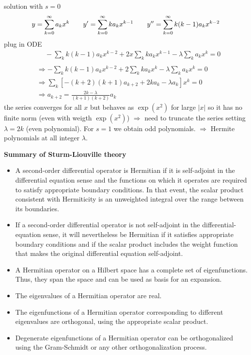 \documentclass{article}
\begin{document}
solution with $s=0$
\begin{equation}
    y = \sum_{k=0}^{\infty} a_k x^k \qquad y' = \sum_{k=0}^{\infty} k a_k x^{k-1} \qquad   y'' = \sum_{k=0}^{\infty} k(k-1) a_k x^{k-2} \\
\end{equation}
plug in ODE
\begin{align*}
& \quad \ - \sum_k k(k-1) a_k x^{k-2}
+ 2x \sum_k k a_k x^{k-1}
- \lambda \sum_k a_k x^k = 0 \\
\\
& \Rightarrow - \sum_k k(k-1) a_k x^{k-2} + 2 \sum_k k a_k x^k
- \lambda \sum_k a_k x^k = 0\\
&\Rightarrow 
\sum_k \left[
-(k+2)(k+1) a_{k+2}
+ 2k a_k
- \lambda a_k
\right] x^k = 0\\
&\Rightarrow 
a_{k+2} = \frac{2k - \lambda}{(k+1)(k+2)} a_k
\end{align*}
the series converges for all $x$ but behaves as $\exp(x^2)$ for large $|x|$ so it has no finite norm (even with weigth $\exp(x^2)$) $\Rightarrow$ need to truncate the series setting $\lambda = 2k$ (even polynomial). For $s=1$ we obtain odd polynomials. $\Rightarrow$ \color{red} Hermite polynomials at all integer $\lambda$. \color{black}

\vspace{3mm}\noindent
\textbf{Summary of Sturm-Liouville theory}
\begin{itemize}
    \item A second-order differential operator is Hermitian if it is self-adjoint in the differential equation sense and the functions on which it operates are required to satisfy appropriate boundary conditions. In that event, the scalar product consistent with Hermiticity is an unweighted integral over the range between its boundaries.
    \item If a second-order differential operator is not self-adjoint in the differential-equation sense, it will nevertheless be Hermitian if it satisfies appropriate boundary conditions and if the scalar product includes the weight function that makes the original differential equation self-adjoint.
    \item A Hermitian operator on a Hilbert space has a complete set of eigenfunctions. Thus, they span the space and can be used as basis for an expansion.
    \item The eigenvalues of a Hermitian operator are real.
    \item The eigenfunctions of a Hermitian operator corresponding to different eigenvalues are orthogonal, using the appropriate scalar product.
    \item Degenerate eigenfunctions of a Hermitian operator can be orthogonalized using the Gram-Schmidt or any other orthogonalization process.
\end{itemize}
\end{document}
